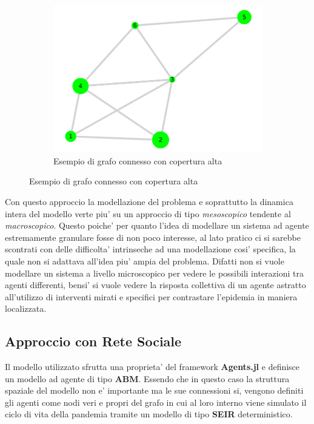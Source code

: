\begin{figure}[!hb]
\begin{subfigure}[b]{0.3\textwidth}
		\centering
		\includegraphics[width=\textwidth]{img/plot_6.pdf}
		\caption{Esempio di grafo connesso con copertura alta}
		\label{fig:connected_graph_example_high}
	\end{subfigure}
\end{figure}

Con questo approccio la modellazione del problema e soprattutto la dinamica intera del 
modello verte piu' su un approccio di tipo \emph{mesoscopico} tendente al \emph{macroscopico}.
Questo poiche' per quanto l'idea di modellare un sistema ad agente estremamente granulare fosse 
di non poco interesse, al lato pratico ci si sarebbe scontrati con delle difficolta' 
intrinseche ad una modellazione cosi' specifica, la quale non si adattava all'idea piu' 
ampia del problema. Difatti non si vuole modellare un sistema a livello microscopico per vedere
le possibili interazioni tra agenti differenti, bensi' si vuole vedere la risposta collettiva di un
agente astratto all'utilizzo di interventi mirati e specifici per contrastare l'epidemia in 
maniera localizzata.

\subsection{Approccio con Rete Sociale}
Il modello utilizzato sfrutta una proprieta' del framework \textbf{Agents.jl} e definisce un 
modello ad agente di tipo \textbf{ABM}. Essendo che in questo caso la struttura spaziale 
del modello non e' importante ma le sue connessioni si, vengono definiti gli agenti come nodi
veri e propri del grafo in cui al loro interno viene simulato il ciclo di vita della pandemia 
tramite un modello di tipo \textbf{SEIR} deterministico.

